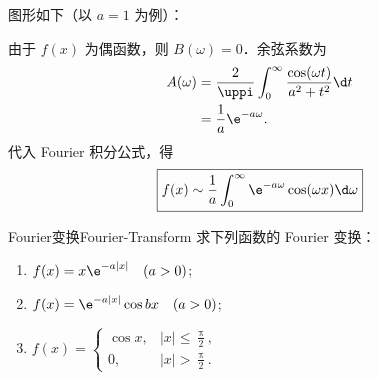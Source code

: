 \begin{solution}
    图形如下（以 $a=1$ 为例）：
    \begin{center}
    \end{center}

    由于 $f(x)$ 为偶函数，则 $B(\omega) = 0$．余弦系数为
    \begin{equation}\label{eq:p1s3-A}
        \begin{aligned}
            A(\omega) & = \frac{2}{\uppi} \int_0^{\infty} \frac{\cos(\omega t)}{a^2+t^2} \d t \\
                      & = \frac{1}{a} \e^{-a\omega}.
        \end{aligned}
    \end{equation}
    代入 Fourier 积分公式，得
    \begin{equation}
        \boxed{f(x) \sim \frac{1}{a} \int_0^\infty \e^{-a\omega} \cos(\omega x) \d\omega}
    \end{equation}
\end{solution}

\begin{problem}{Fourier变换}{Fourier-Transform}
    求下列函数的 Fourier 变换：
    \begin{enumerate}
        \item $f(x) = x\e^{-a|x|} \quad (a > 0)$;
        \item $f(x) = \e^{-a|x|} \cos bx \quad (a > 0)$;
        \item $f(x) = \begin{cases} \cos x, & |x| \leqslant \frac{\uppi}{2}, \\ 0, & |x| > \frac{\uppi}{2}. \end{cases}$
    \end{enumerate}
\end{problem}

